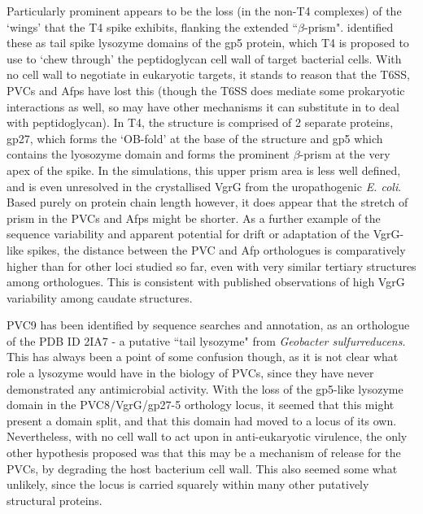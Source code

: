 Particularly prominent appears to be the loss (in the non-T4 complexes) of the `wings' that the T4 spike exhibits, flanking the extended ``$\beta$-prism". \cite{Kanamaru2002a} identified these as tail spike lysozyme domains of the gp5 protein, which T4 is proposed to use to `chew through' the peptidoglycan cell wall of target bacterial cells. With no cell wall to negotiate in eukaryotic targets, it stands to reason that the T6SS, PVCs and Afps have lost this (though the T6SS does mediate some prokaryotic interactions as well, so may have other mechanisms it can substitute in to deal with peptidoglycan). In T4, the structure is comprised of 2 separate proteins, gp27, which forms the `OB-fold' at the base of the structure and gp5 which contains the lyosozyme domain and forms the prominent $\beta$-prism at the very apex of the spike. In the simulations, this upper prism area is less well defined, and is even unresolved in the crystallised VgrG from the uropathogenic \emph{E. coli}. Based purely on protein chain length however, it does appear that the stretch of prism in the PVCs and Afps might be shorter. As a further example of the sequence variability and apparent potential for drift or adaptation of the VgrG-like spikes, the distance between the PVC and Afp orthologues is comparatively higher than for other loci studied so far, even with very similar tertiary structures among orthologues. This is consistent with published observations of high VgrG variability among caudate structures.

PVC9 has been identified by sequence searches and annotation, as an orthologue of the PDB ID 2IA7 - a putative ``tail lysozyme" from \emph{Geobacter sulfurreducens}. This has always been a point of some confusion though, as it is not clear what role a lysozyme would have in the biology of PVCs, since they have never demonstrated any antimicrobial activity. With the loss of the gp5-like lysozyme domain in the PVC8/VgrG/gp27-5 orthology locus, it seemed that this might present a domain split, and that this domain had moved to a locus of its own. Nevertheless, with no cell wall to act upon in anti-eukaryotic virulence, the only other hypothesis proposed was that this may be a mechanism of release for the PVCs, by degrading the host bacterium cell wall. This also seemed some what unlikely, since the locus is carried squarely within many other putatively structural proteins.

